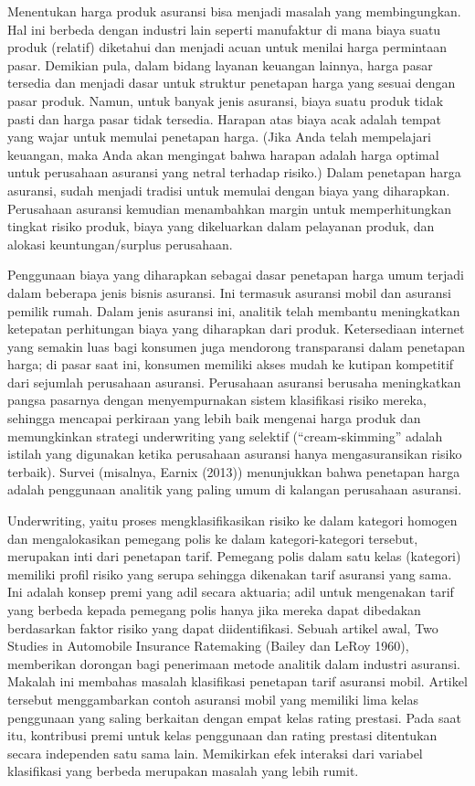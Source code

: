 \documentclass[
]{book}
\begin{document}
Menentukan harga produk asuransi bisa menjadi masalah yang membingungkan. Hal ini berbeda dengan industri lain seperti manufaktur di mana biaya suatu produk (relatif) diketahui dan menjadi acuan untuk menilai harga permintaan pasar. Demikian pula, dalam bidang layanan keuangan lainnya, harga pasar tersedia dan menjadi dasar untuk struktur penetapan harga yang sesuai dengan pasar produk. Namun, untuk banyak jenis asuransi, biaya suatu produk tidak pasti dan harga pasar tidak tersedia. Harapan atas biaya acak adalah tempat yang wajar untuk memulai penetapan harga. (Jika Anda telah mempelajari keuangan, maka Anda akan mengingat bahwa harapan adalah harga optimal untuk perusahaan asuransi yang netral terhadap risiko.) Dalam penetapan harga asuransi, sudah menjadi tradisi untuk memulai dengan biaya yang diharapkan. Perusahaan asuransi kemudian menambahkan margin untuk memperhitungkan tingkat risiko produk, biaya yang dikeluarkan dalam pelayanan produk, dan alokasi keuntungan/surplus perusahaan.

Penggunaan biaya yang diharapkan sebagai dasar penetapan harga umum terjadi dalam beberapa jenis bisnis asuransi. Ini termasuk asuransi mobil dan asuransi pemilik rumah. Dalam jenis asuransi ini, analitik telah membantu meningkatkan ketepatan perhitungan biaya yang diharapkan dari produk. Ketersediaan internet yang semakin luas bagi konsumen juga mendorong transparansi dalam penetapan harga; di pasar saat ini, konsumen memiliki akses mudah ke kutipan kompetitif dari sejumlah perusahaan asuransi. Perusahaan asuransi berusaha meningkatkan pangsa pasarnya dengan menyempurnakan sistem klasifikasi risiko mereka, sehingga mencapai perkiraan yang lebih baik mengenai harga produk dan memungkinkan strategi underwriting yang selektif (``cream-skimming'' adalah istilah yang digunakan ketika perusahaan asuransi hanya mengasuransikan risiko terbaik). Survei (misalnya, Earnix (2013)) menunjukkan bahwa penetapan harga adalah penggunaan analitik yang paling umum di kalangan perusahaan asuransi.

Underwriting, yaitu proses mengklasifikasikan risiko ke dalam kategori homogen dan mengalokasikan pemegang polis ke dalam kategori-kategori tersebut, merupakan inti dari penetapan tarif. Pemegang polis dalam satu kelas (kategori) memiliki profil risiko yang serupa sehingga dikenakan tarif asuransi yang sama. Ini adalah konsep premi yang adil secara aktuaria; adil untuk mengenakan tarif yang berbeda kepada pemegang polis hanya jika mereka dapat dibedakan berdasarkan faktor risiko yang dapat diidentifikasi. Sebuah artikel awal, Two Studies in Automobile Insurance Ratemaking (Bailey dan LeRoy 1960), memberikan dorongan bagi penerimaan metode analitik dalam industri asuransi. Makalah ini membahas masalah klasifikasi penetapan tarif asuransi mobil. Artikel tersebut menggambarkan contoh asuransi mobil yang memiliki lima kelas penggunaan yang saling berkaitan dengan empat kelas rating prestasi. Pada saat itu, kontribusi premi untuk kelas penggunaan dan rating prestasi ditentukan secara independen satu sama lain. Memikirkan efek interaksi dari variabel klasifikasi yang berbeda merupakan masalah yang lebih rumit.
\end{document}
